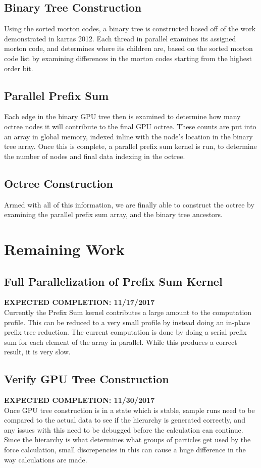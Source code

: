 \documentclass[fleqn,10pt]{SelfArx} %
\begin{document}
\subsection{Binary Tree Construction}
Using the sorted morton codes, a binary tree is constructed based off of the work demonstrated in karras 2012. Each thread in parallel examines its assigned morton code, and determines where its children are, based on the sorted morton code list by examining differences in the morton codes starting from the highest order bit.

\subsection{Parallel Prefix Sum}
Each edge in the binary GPU tree then is examined to determine how many octree nodes it will contribute to the final GPU octree. These counts are put into an array in global memory, indexed inline with the node’s location in the binary tree array. Once this is complete, a parallel prefix sum kernel is run, to determine the number of nodes and final data indexing in the octree. 

\subsection{Octree Construction}
Armed with all of this information, we are finally able to construct the octree by examining the parallel prefix sum array, and the binary tree ancestors. 


\section{Remaining Work}

\subsection{Full Parallelization of Prefix Sum Kernel}
\textbf{EXPECTED COMPLETION: 11/17/2017}\\
Currently the Prefix Sum kernel contributes a large amount to the computation profile. This can be reduced to a very small profile by instead doing an in-place prefix tree reduction. The current computation is done by doing a serial prefix sum for each element of the array in parallel. While this produces a correct result, it is very slow.

\subsection{Verify GPU Tree Construction}
\textbf{EXPECTED COMPLETION: 11/30/2017}\\
Once GPU tree construction is in a state which is stable, sample runs need to be compared to the actual data to see if the hierarchy is generated correctly, and any issues with this need to be debugged before the calculation can continue. Since the hierarchy is what determines what groups of particles get used by the force calculation, small discrepencies in this can cause a huge difference in the way calculations are made.
\end{document}

